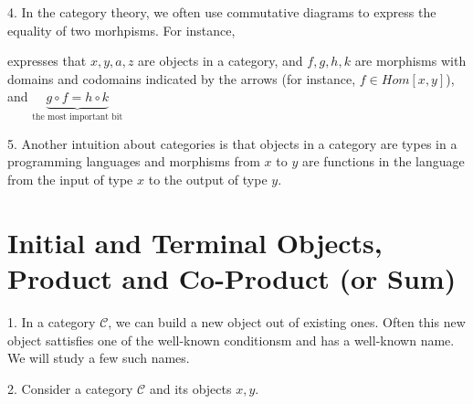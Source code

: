 \documentclass{report}[12pt]
\begin{document}
4. In the category theory, we often use commutative diagrams to express the equality of two morhpisms. For instance,
expresses that $x, y, a, z$ are objects in a category, and $f, g, h, k$ are morphisms with domains and codomains indicated by the arrows (for instance, $f \in Hom[x, y]$),
and $\underbrace{g \circ f = h \circ k}_{\text{the most important bit}}$

5. Another intuition about categories is that objects in a category are types in a programming languages and morphisms from $x$ to $y$ are functions in the language from the input of type $x$ to the output of type $y$.

\section{Initial and Terminal Objects, Product and Co-Product (or Sum)}
1. In a category $\mathcal{C}$, we can build a new object out of existing ones. Often this new object sattisfies one of the well-known conditionsm and has a well-known name. We will study a few such names.

2. Consider a category $\mathcal{C}$ and its objects $x, y$.
\end{document}
